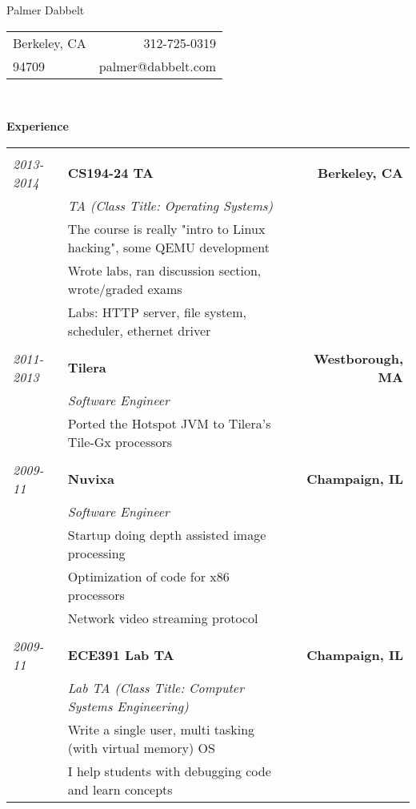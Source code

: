\documentclass{letter}
\newcommand{\experience}[4]{&& \\
\textit{#1} \hspace{0.2in} & \textbf{#2} & \textbf{#3} \\
& \textit{#4} & \\}
\newcommand{\subexperience}[1]{& #1 & \\}
\begin{document}
\thispagestyle{empty}

\LARGE
\begin{center}Palmer Dabbelt\end{center}
\normalsize

\begin{tabular*}{\textwidth}{@{\extracolsep{\fill}} l r}
  Berkeley, CA& 312-725-0319 \\
  94709 & palmer@dabbelt.com \\
  \hline
\end{tabular*}\\
\vspace{0.2in}

\textbf{Experience}\\
\begin{tabular*}{\textwidth}{l l @{\extracolsep{\fill}} r}
  \experience{2013-2014}{CS194-24 TA}{Berkeley, CA}{TA (Class Title: Operating Systems)}
  \subexperience{The course is really "intro to Linux hacking", some QEMU development}
  \subexperience{Wrote labs, ran discussion section, wrote/graded exams}
  \subexperience{Labs: HTTP server, file system, scheduler, ethernet driver}

  \experience{2011-2013}{Tilera}{Westborough, MA}{Software Engineer}
  \subexperience{Ported the Hotspot JVM to Tilera's Tile-Gx processors}

  \experience{2009-11}{Nuvixa}{Champaign, IL}{Software Engineer}
  \subexperience{Startup doing depth assisted image processing}
  \subexperience{Optimization of code for x86 processors}
  \subexperience{Network video streaming protocol}
  
  \experience{2009-11}{ECE391 Lab TA}{Champaign, IL}{Lab TA (Class Title: Computer Systems Engineering)}
  \subexperience{Write a single user, multi tasking (with virtual memory) OS}
  \subexperience{I help students with debugging code and learn concepts}
\end{tabular*}\\
\vspace{0.2in}
\end{document}
